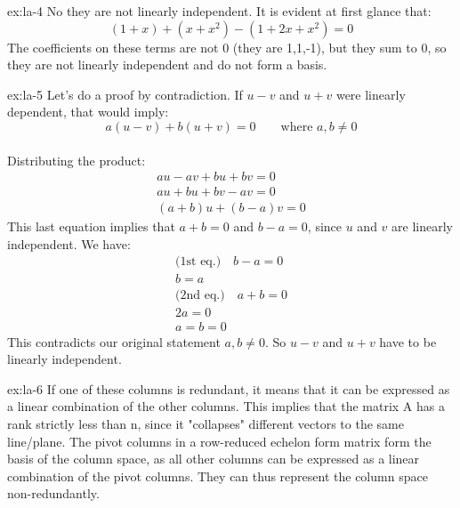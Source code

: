 \begin{solution}{ex:la-4}
  No they are not linearly independent. It is evident at first glance that:
  \[
    (1+x)+(x+x^2)-(1+2x+x^2)=0
  \]
  The coefficients on these terms are not 0 (they are 1,1,-1), but they sum to 0, so they are not linearly independent and do not form a basis.
\end{solution}
\begin{solution}{ex:la-5}
  Let's do a proof by contradiction. If $u-v$ and $u+v$ were linearly dependent, that would imply:
  \[
    a(u-v)+b(u+v)=0 \qquad\text{where } a,b\neq 0
  \]\\
  Distributing the product:
  \[
    \begin{gathered}
      au-av+bu+bv=0\\
      au+bu+bv-av=0\\
      (a+b)u+(b-a)v=0
    \end{gathered}
  \]
  This last equation implies that $a+b=0$ and $b-a=0$, since $u$ and $v$ are linearly independent. We have:
  \[
    \begin{gathered}
      \text{(1st eq.)}\quad b-a=0\\
      b=a\\
      \text{(2nd eq.)}\quad a+b=0\\
      2a=0\\
      a=b=0
    \end{gathered}
  \]
    This contradicts our original statement $a,b\neq 0$. So $u-v$ and $u+v$ have to be linearly independent.
\end{solution}

\begin{solution}{ex:la-6}
  If one of these columns is redundant, it means that it can be expressed as a linear combination of the other columns. This implies that the matrix A has a rank strictly less than n, since it "collapses" different vectors to the same line/plane.
  The pivot columns in a row-reduced echelon form matrix form the basis of the column space, as all other columns can be expressed as a linear combination of the pivot columns.
  They can thus represent the column space non-redundantly.


\end{solution}

